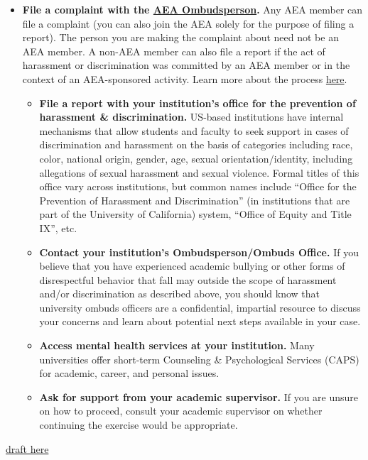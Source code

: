 \documentclass[]{book}
\providecommand{\tightlist}{%
  \setlength{\itemsep}{0pt}\setlength{\parskip}{0pt}}
\begin{document}
\begin{itemize}
\tightlist
\item
  \textbf{File a complaint with the \href{https://www.aeaweb.org/about-aea/aea-ombudsperson}{AEA Ombudsperson}.} Any AEA member can file a complaint (you can also join the AEA solely for the purpose of filing a report). The person you are making the complaint about need not be an AEA member. A non-AEA member can also file a report if the act of harassment or discrimination was committed by an AEA member or in the context of an AEA-sponsored activity. Learn more about the process \href{https://www.aeaweb.org/about-aea/aea-ombudsperson/faq}{here}.

  \begin{itemize}
  \tightlist
  \item
    \textbf{File a report with your institution's office for the prevention of harassment \& discrimination.} US-based institutions have internal mechanisms that allow students and faculty to seek support in cases of discrimination and harassment on the basis of categories including race, color, national origin, gender, age, sexual orientation/identity, including allegations of sexual harassment and sexual violence. Formal titles of this office vary across institutions, but common names include ``Office for the Prevention of Harassment and Discrimination'' (in institutions that are part of the University of California) system, ``Office of Equity and Title IX'', etc.
  \item
    \textbf{Contact your institution's Ombudsperson/Ombuds Office.} If you believe that you have experienced academic bullying or other forms of disrespectful behavior that fall may outside the scope of harassment and/or discrimination as described above, you should know that university ombuds officers are a confidential, impartial resource to discuss your concerns and learn about potential next steps available in your case.
  \item
    \textbf{Access mental health services at your institution.} Many universities offer short-term Counseling \& Psychological Services (CAPS) for academic, career, and personal issues.
  \item
    \textbf{Ask for support from your academic supervisor.} If you are unsure on how to proceed, consult your academic supervisor on whether continuing the exercise would be appropriate.
  \end{itemize}
\end{itemize}

\href{https://docs.google.com/document/d/1xJ7pZTQ1VQXVCrs6IUlp7HlBB4oxYha0oOniCG2SWLM/edit?ts=5d251563}{draft here}
\end{document}

